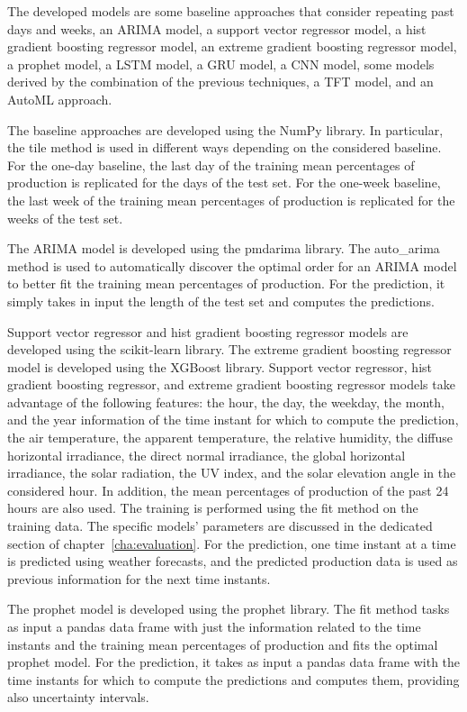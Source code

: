 The developed models are some baseline approaches that consider repeating past days and weeks, an ARIMA model, a support vector regressor model, a hist gradient boosting regressor model, an extreme gradient boosting regressor model, a prophet model, a LSTM model, a GRU model, a CNN model, some models derived by the combination of the previous techniques, a TFT model, and an AutoML approach.

The baseline approaches are developed using the NumPy library.
In particular, the tile method is used in different ways depending on the considered baseline.
For the one-day baseline, the last day of the training mean percentages of production is replicated for the days of the test set.
For the one-week baseline, the last week of the training mean percentages of production is replicated for the weeks of the test set.

The ARIMA model is developed using the pmdarima library.
The auto\_arima method is used to automatically discover the optimal order for an ARIMA model to better fit the training mean percentages of production.
For the prediction, it simply takes in input the length of the test set and computes the predictions.

Support vector regressor and hist gradient boosting regressor models are developed using the scikit-learn library.
The extreme gradient boosting regressor model is developed using the XGBoost library.
Support vector regressor, hist gradient boosting regressor, and extreme gradient boosting regressor models take advantage of the following features: the hour, the day, the weekday, the month, and the year information of the time instant for which to compute the prediction, the air temperature, the apparent temperature, the relative humidity, the diffuse horizontal irradiance, the direct normal irradiance, the global horizontal irradiance, the solar radiation, the UV index, and the solar elevation angle in the considered hour.
In addition, the mean percentages of production of the past 24 hours are also used.
The training is performed using the fit method on the training data.
The specific models’ parameters are discussed in the dedicated section of chapter~\ref{cha:evaluation}.
For the prediction, one time instant at a time is predicted using weather forecasts, and the predicted production data is used as previous information for the next time instants.

The prophet model is developed using the prophet library.
The fit method tasks as input a pandas data frame with just the information related to the time instants and the training mean percentages of production and fits the optimal prophet model.
For the prediction, it takes as input a pandas data frame with the time instants for which to compute the predictions and computes them, providing also uncertainty intervals.

